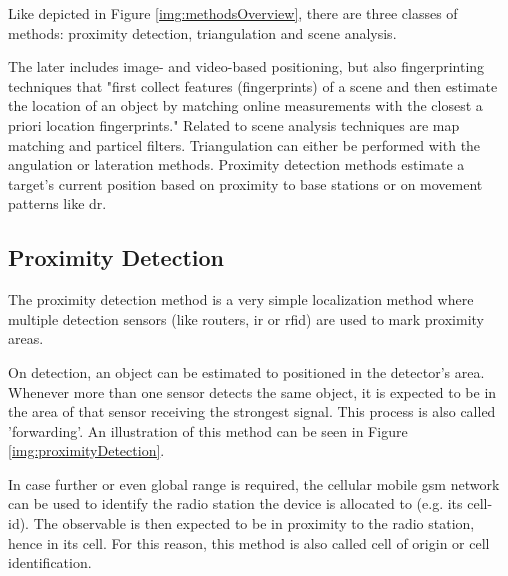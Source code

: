 Like depicted in Figure \ref{img:methodsOverview}, there are three classes of methods: proximity detection, triangulation and scene analysis. 


The later includes image- and video-based positioning, but also fingerprinting techniques that "first collect features (fingerprints) of a scene and then estimate	the location of an object by matching online measurements with the closest a priori location fingerprints." \cite{wirelessILSystemsAndTechniquesSurvey}  Related to scene analysis techniques are map matching and particel filters. Triangulation can either be performed with the angulation or lateration methods.
Proximity detection methods estimate a target's current position based on proximity to base stations or on movement patterns like \ac{dr}. 


\subsection{Proximity Detection}

The proximity detection method is a very simple localization method where multiple detection sensors (like routers, \ac{ir} or \ac{rfid}) are used to mark proximity areas. 

On detection, an object can be estimated to positioned in the detector's area. Whenever more than one sensor detects the same object, it is expected to be in the area of that sensor receiving the strongest signal. This process is also called 'forwarding'.
An illustration of this method can be seen in Figure \ref{img:proximityDetection}.

In case further or even global range is required, the cellular mobile \ac{gsm} network can be used to identify the radio station the device is allocated to (e.g. its cell-id). The observable is then expected to be in proximity to the radio station, hence in its cell. %
\cite[p.5]{wirelessILSystemsAndTechniquesSurvey} For this reason, this method is also called cell of origin or cell identification.

